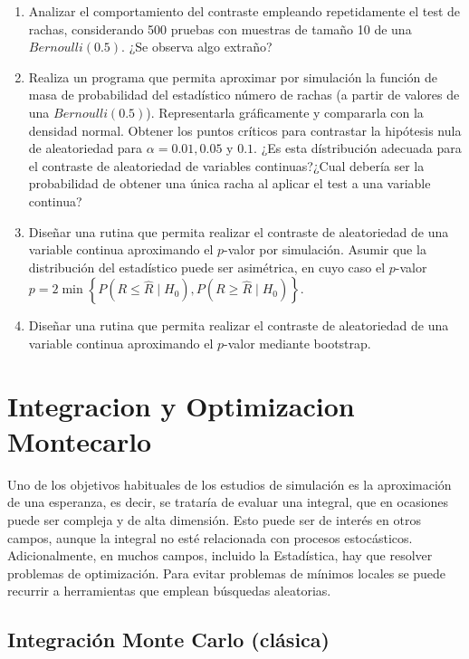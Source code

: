 \documentclass[
]{book}
\theoremstyle{break}
\theoremstyle{definition}
\theoremstyle{definition}
\theoremstyle{definition}
\theoremstyle{remark}
\begin{document}
\begin{enumerate}
\def\labelenumi{\alph{enumi})}
\item
  Analizar el comportamiento del contraste empleando repetidamente
  el test de rachas, considerando 500 pruebas con muestras de
  tamaño 10 de una \(Bernoulli(0.5)\). ¿Se observa algo extraño?
\item
  Realiza un programa que permita aproximar por simulación la
  función de masa de probabilidad del estadístico número de rachas
  (a partir de valores de una \(Bernoulli(0.5)\)). Representarla
  gráficamente y compararla con la densidad normal. Obtener los
  puntos críticos para contrastar la hipótesis nula de
  aleatoriedad para \(\alpha=0.01,0.05\) y \(0.1\). ¿Es esta
  dístribución adecuada para el contraste de aleatoriedad de
  variables continuas?¿Cual debería ser la probabilidad de obtener
  una única racha al aplicar el test a una variable continua?
\item
  Diseñar una rutina que permita realizar el contraste de
  aleatoriedad de una variable continua aproximando el \(p\)-valor
  por simulación. Asumir que la distribución del estadístico puede
  ser asimétrica, en cuyo caso el \(p\)-valor
  \(p=2\min\left\{ P\left( R\leq\hat{R}\mid H_{0}\right) , P\left( R\geq \hat{R}\mid H_{0}\right) \right\}\).
\item
  Diseñar una rutina que permita realizar el contraste de
  aleatoriedad de una variable continua aproximando el \(p\)-valor
  mediante bootstrap.
\end{enumerate}

\hypertarget{cap9}{%
\chapter{Integracion y Optimizacion Montecarlo}\label{cap9}}

Uno de los objetivos habituales de los estudios de simulación es la aproximación de una esperanza, es decir, se trataría de evaluar una integral, que en ocasiones puede ser compleja y de alta dimensión. Esto puede ser de interés en otros campos, aunque la integral no esté relacionada con procesos estocásticos. Adicionalmente, en muchos campos, incluido la Estadística, hay que resolver problemas de optimización. Para evitar problemas de mínimos locales se puede recurrir a herramientas que emplean búsquedas aleatorias.

\hypertarget{integraciuxf3n-monte-carlo-cluxe1sica}{%
\section{Integración Monte Carlo (clásica)}\label{integraciuxf3n-monte-carlo-cluxe1sica}}
\end{document}

